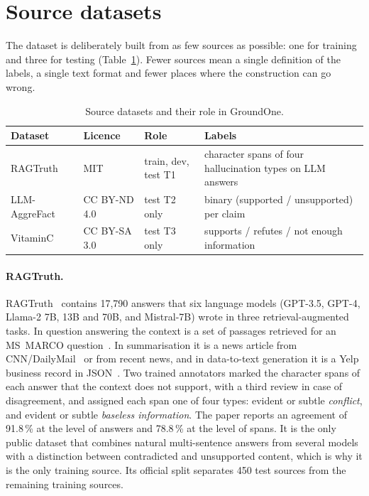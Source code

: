 \section{Source datasets}
\label{sec:data-sources}

The dataset is deliberately built from as few sources as possible: one for training and three for testing
(Table~\ref{tab:data-sources}). Fewer sources mean a single definition of the labels, a single text format and fewer
places where the construction can go wrong.

\begin{table}[htbp]
\centering
\caption{Source datasets and their role in GroundOne.}
\label{tab:data-sources}
\small
\begin{tabularx}{\textwidth}{@{}lllX@{}}
\toprule
Dataset & Licence & Role & Labels \\
\midrule
RAGTruth~\cite{niu2024ragtruth} & MIT & train, dev, test T1 & character spans of four hallucination types on LLM answers \\
LLM-AggreFact~\cite{tang2024minicheck,llmaggrefact} & CC BY-ND 4.0 & test T2 only & binary (supported / unsupported) per claim \\
VitaminC~\cite{schuster2021vitaminc} & CC BY-SA 3.0 & test T3 only & supports / refutes / not enough information \\
\bottomrule
\end{tabularx}
\end{table}

\paragraph{RAGTruth.} RAGTruth~\cite{niu2024ragtruth} contains 17{,}790 answers that six language models (GPT-3.5,
GPT-4, Llama-2 7B, 13B and 70B, and Mistral-7B) wrote in three retrieval-augmented tasks. In question answering the
context is a set of passages retrieved for an MS~MARCO question~\cite{nguyen2016msmarco}. In summarisation it is a
news article from CNN/DailyMail~\cite{hermann2015teaching,see2017pointer} or from recent news, and in data-to-text
generation it is a Yelp business record in JSON~\cite{yelpdataset}. Two trained annotators marked the character spans
of each answer that the context does not support, with a third review in case of disagreement, and assigned each span
one of four types: evident or subtle \emph{conflict}, and evident or subtle \emph{baseless information}. The paper
reports an agreement of 91.8\,\% at the level of answers and 78.8\,\% at the level of spans. It is the only public
dataset that combines natural multi-sentence answers from several models with a distinction between contradicted and
unsupported content, which is why it is the only training source. Its official split separates 450 test sources from
the remaining training sources.

